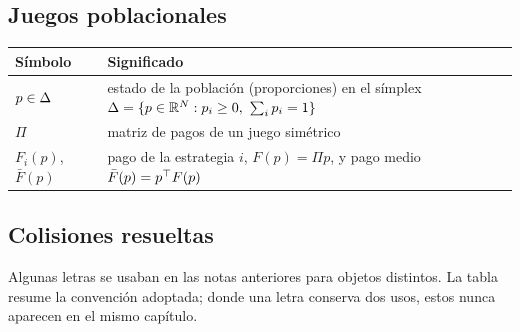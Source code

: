 \subsection*{Juegos poblacionales}


\small
\begin{tabular}{@{}>{\raggedright\arraybackslash}p{3.0cm}>{\raggedright\arraybackslash}p{9.5cm}@{}}
\toprule
Símbolo & Significado \\
\midrule
$p\in\Delta$ & estado de la población (proporciones) en el símplex $\simplex=\{p\in\R^N:p_i\ge0,\ \sum_ip_i=1\}$ \\
$\Pi$ & matriz de pagos de un juego simétrico \\
$F_i(p)$, $\bar F(p)$ & pago de la estrategia $i$, $F(p)=\Pi p$, y pago medio $\bar F(p)=p^{\top} F(p)$ \\
\bottomrule
\end{tabular}


\subsection*{Colisiones resueltas}

Algunas letras se usaban en las notas anteriores para objetos distintos. La tabla resume la convención adoptada; donde una letra conserva dos usos, estos nunca aparecen en el mismo capítulo.


